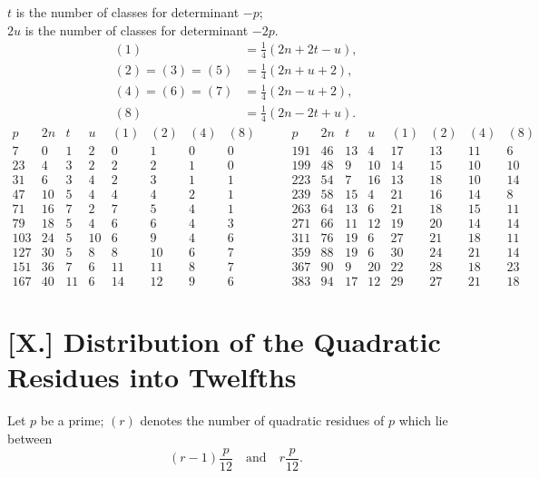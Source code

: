 \documentclass[12pt]{article}
\begin{document}
$t$ is the number of classes for determinant $-p$;\\
$2u$ is the number of classes for determinant $-2p$.
\[
\begin{aligned}
(1)&=\frac14(2n+2t-u),\\
(2)=(3)=(5)&=\frac14(2n+u+2),\\
(4)=(6)=(7)&=\frac14(2n-u+2),\\
(8)&=\frac14(2n-2t+u).
\end{aligned}
\]
{\scriptsize
\[
\begin{array}{r|r|r|r|r|r|r|r}
p&2n&t&u&(1)&(2)&(4)&(8)\\\hline
7&0&1&2&0&1&0&0\\
23&4&3&2&2&2&1&0\\
31&6&3&4&2&3&1&1\\
47&10&5&4&4&4&2&1\\
71&16&7&2&7&5&4&1\\
79&18&5&4&6&6&4&3\\
103&24&5&10&6&9&4&6\\
127&30&5&8&8&10&6&7\\
151&36&7&6&11&11&8&7\\
167&40&11&6&14&12&9&6
\end{array}
\qquad
\begin{array}{r|r|r|r|r|r|r|r}
p&2n&t&u&(1)&(2)&(4)&(8)\\\hline
191&46&13&4&17&13&11&6\\
199&48&9&10&14&15&10&10\\
223&54&7&16&13&18&10&14\\
239&58&15&4&21&16&14&8\\
263&64&13&6&21&18&15&11\\
271&66&11&12&19&20&14&14\\
311&76&19&6&27&21&18&11\\
359&88&19&6&30&24&21&14\\
367&90&9&20&22&28&18&23\\
383&94&17&12&29&27&21&18
\end{array}
\]
}

\section*{[X.] Distribution of the Quadratic Residues into Twelfths}

Let $p$ be a prime; $(r)$ denotes the number of quadratic residues of $p$ which lie between
\[
(r-1)\frac{p}{12}\quad \text{and}\quad r\frac{p}{12}.
\]
\end{document}
